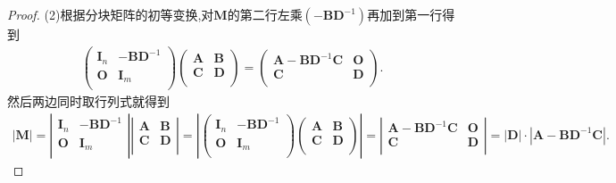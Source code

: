 \documentclass[../../main.tex]{subfiles}%
\begin{document}
\begin{proof}
(2)根据分块矩阵的初等变换,对$\boldsymbol{M}$的第二行左乘$(-\boldsymbol{BD}^{-1})$再加到第一行得到
\begin{align*}
\left( \begin{matrix}
\boldsymbol{I}_n&		-\boldsymbol{BD}^{-1}\\
\boldsymbol{O}&		\boldsymbol{I}_m\\
\end{matrix} \right) \left( \begin{matrix}
\boldsymbol{A}&		\boldsymbol{B}\\
\boldsymbol{C}&		\boldsymbol{D}\\
\end{matrix} \right) =\left( \begin{matrix}
\boldsymbol{A}-\boldsymbol{BD}^{-1}\boldsymbol{C}&		\boldsymbol{O}\\
\boldsymbol{C}&		\boldsymbol{D}\\
\end{matrix} \right) .
\end{align*}
然后两边同时取行列式就得到
\begin{align*}
\left| \boldsymbol{M} \right|=\left| \begin{matrix}
\boldsymbol{I}_n&		-\boldsymbol{BD}^{-1}\\
\boldsymbol{O}&		\boldsymbol{I}_m\\
\end{matrix} \right|\left| \begin{matrix}
\boldsymbol{A}&		\boldsymbol{B}\\
\boldsymbol{C}&		\boldsymbol{D}\\
\end{matrix} \right|=\left| \left( \begin{matrix}
\boldsymbol{I}_n&		-\boldsymbol{BD}^{-1}\\
\boldsymbol{O}&		\boldsymbol{I}_m\\
\end{matrix} \right) \left( \begin{matrix}
\boldsymbol{A}&		\boldsymbol{B}\\
\boldsymbol{C}&		\boldsymbol{D}\\
\end{matrix} \right) \right|=\left| \begin{matrix}
\boldsymbol{A}-\boldsymbol{BD}^{-1}\boldsymbol{C}&		\boldsymbol{O}\\
\boldsymbol{C}&		\boldsymbol{D}\\
\end{matrix} \right|=|\boldsymbol{D}|\cdot |\boldsymbol{A}-\boldsymbol{BD}^{-1}\boldsymbol{C}|.
\end{align*}


\end{proof}
\end{document}
